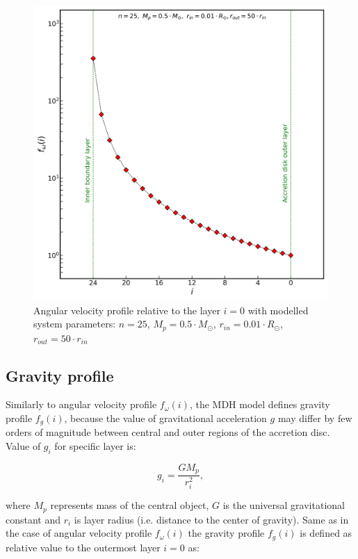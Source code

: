 \begin{figure}[H]
\centering
\includegraphics[width=0.9\columnwidth]{img/profile_omega.png}
\caption{Angular velocity profile relative to the layer $i = 0$ with modelled system parameters: $n=25$, $M_p = 0.5 \cdot M_{\odot}$, $r_{in} = 0.01 \cdot R_{\odot}$, $r_{out} = 50 \cdot r_{in}$}
\label{fig:profile_omega}
\end{figure}

\subsection{Gravity profile}

Similarly to angular velocity profile $f_{\omega}(i)$, the MDH model defines gravity profile $f_g(i)$, because the value of gravitational acceleration $g$ may differ by few orders of magnitude between central and outer regions of the accretion disc.  Value of $g_i$ for specific layer is:

\begin{equation} \label{eq:layer_g}
g_{i} = \frac{GM_{p}}{r_{i}^2},
\end{equation}

where $M_p$ represents mass of the central object, $G$ is the universal gravitational constant and $r_i$ is layer radius (i.e. distance to the center of gravity). Same as in the case of angular velocity profile $f_{\omega}(i)$ the gravity profile $f_g(i)$ is defined as relative value to the outermost layer $i = 0$ as:

